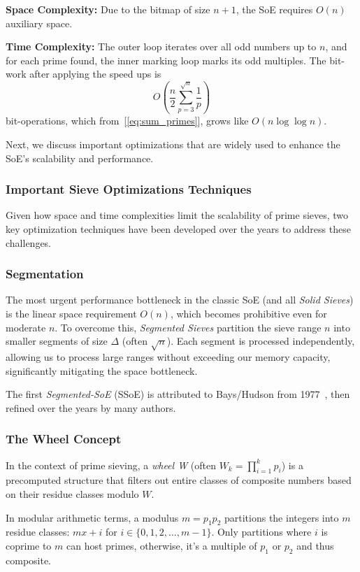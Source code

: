 \documentclass{article}
\begin{document}
\noindent
\textbf{Space Complexity:} Due to the bitmap of size $n+1$, the SoE requires $O(n)$ auxiliary space.

\noindent
\textbf{Time Complexity:} The outer loop iterates over all odd numbers up to $n$, and for each prime found, the inner marking loop marks its odd multiples. The bit-work after applying the speed ups is
\[
O\!\left(\frac{n}{2}\sum_{p=3}^{\sqrt n}\frac{1}{p}\right)
\]
bit-operations, which from~[\ref{eq:sum_primes}], grows like $O(n \log \log n)$.

Next, we discuss important optimizations that are widely used to enhance the SoE's scalability and performance.

\subsubsection{Important Sieve Optimizations Techniques}
Given how space and time complexities limit the scalability of prime sieves, two key optimization techniques have been developed over the years to address these challenges.

\subsubsection*{Segmentation}
The most urgent performance bottleneck in the classic SoE (and all \emph{Solid Sieves}) is the linear space requirement $O(n)$, which becomes prohibitive even for moderate $n$. 
To overcome this, \emph{Segmented Sieves} partition the sieve range $n$ into smaller segments of size $\Delta$ (often $\sqrt{n}$). Each segment is processed independently, allowing us to process large ranges without exceeding our memory capacity, significantly mitigating the space bottleneck.

The first \emph{Segmented-SoE} (SSoE) is attributed to Bays/Hudson from 1977~\cite{BaysHudson1977}, then refined over the years by many authors.

\subsubsection*{The Wheel Concept}
In the context of prime sieving, a \emph{wheel W} (often $W_k=\prod_{i=1}^k p_i$) is a precomputed structure that filters out entire classes of composite numbers based on their residue classes modulo $W$.

In modular arithmetic terms, a modulus $m = p_1 p_2$ partitions the integers into $m$ residue classes: $mx + i$ for $i \in \{0, 1, 2, \dots, m-1\}$. 
Only partitions where $i$ is coprime to $m$ can host primes, otherwise, it's a multiple of $p_1$ or $p_2$ and thus composite.
\end{document}
